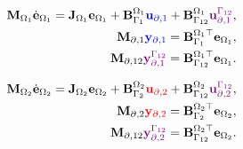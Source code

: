 \begin{tcbraster}[raster columns=2, raster equal height]
	\begin{tcolorbox}[width=0.48\textwidth, nobeforeafter, colframe=cyan,title=System \eqref{eq:pHlinsys_findim_Om1},  coltitle=black]%
	\begin{equation}\label{eq:pHfindim_Om1}
	\begin{aligned}
	\mathbf{M}_{\Omega_1}
	\dot{\mathbf{e}}_{\Omega_1}
	= \mathbf{J}_{\Omega_1} {\mathbf{e}}_{\Omega_1} + 
	\mathbf{B}_{\Gamma_1}^{\Omega_1} \textcolor{blue}{\mathbf{u}_{\partial, 1}} + \mathbf{B}_{\Gamma_{12}}^{\Omega_1}
	\textcolor{violet}{\mathbf{u}_{\partial, 1}^{\Gamma_{12}}}, \\
	\mathbf{M}_{\partial, 1} \textcolor{blue}{\mathbf{y}_{\partial, 1}} = \mathbf{B}_{\Gamma_1}^{\Omega_1 \top} \mathbf{e}_{\Omega_1}, \\
	\mathbf{M}_{\partial, 12} \textcolor{violet}{\mathbf{y}_{\partial, 1}^{\Gamma_{12}}} = \mathbf{B}_{\Gamma_{12}}^{\Omega_1 \top} \mathbf{e}_{\Omega_1}.
	\end{aligned}
	\end{equation}
	\end{tcolorbox} 
	\begin{tcolorbox}[width=0.48\textwidth, nobeforeafter,  colframe=lightyellow,title=System \eqref{eq:pHlinsys_findim_Om2}, coltitle=black]%
	\begin{equation}\label{eq:pHfindim_Om2}
	\begin{aligned}
	\mathbf{M}_{\Omega_2}
	\dot{\mathbf{e}}_{\Omega_2}
	= \mathbf{J}_{\Omega_2} {\mathbf{e}}_{\Omega_2} + 
	\mathbf{B}_{\Gamma_2}^{\Omega_2} \textcolor{red}{\mathbf{u}_{\partial, 2}} + \mathbf{B}_{\Gamma_{12}}^{\Omega_2}
	\textcolor{violet}{\mathbf{u}_{\partial, 2}^{\Gamma_{12}}}, \\
	\mathbf{M}_{\partial, 2} \textcolor{red}{\mathbf{y}_{\partial, 2}} = \mathbf{B}_{\Gamma_2}^{\Omega_2 \top} \mathbf{e}_{\Omega_2}, \\
	\mathbf{M}_{\partial, 12} \textcolor{violet}{\mathbf{y}_{\partial, 2}^{\Gamma_{12}}} = \mathbf{B}_{\Gamma_{12}}^{\Omega_2 \top} \mathbf{e}_{\Omega_2}.
	\end{aligned}
	\end{equation}
	\end{tcolorbox}
\end{tcbraster}

